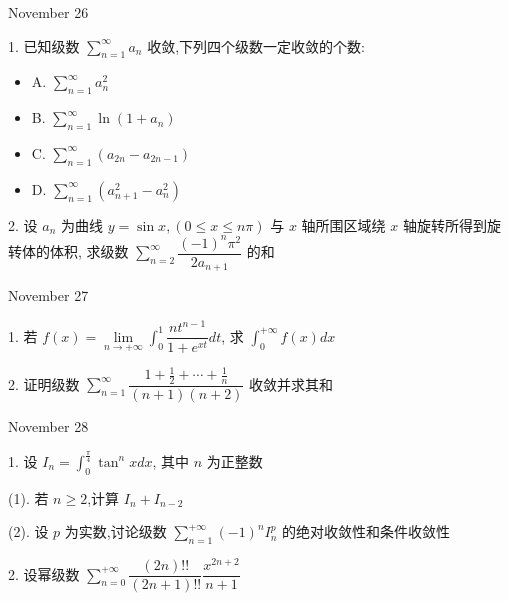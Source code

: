 \textcolor{purplea}{November 26}

1. 已知级数 $\sum\limits_{n=1}^{\infty}a_{n}$ 收敛,下列四个级数一定收敛的个数:
\begin{itemize}
	\item A. $\sum\limits_{n=1}^{\infty}a_{n}^{2}$
	\item B. $\sum\limits_{n=1}^{\infty}\ln(1+a_{n})$
	\item C. $\sum\limits_{n=1}^{\infty}(a_{2n}-a_{2n-1})$
	\item D. $\sum\limits_{n=1}^{\infty}(a_{n+1}^{2}-a_{n}^{2})$
\end{itemize}
\begin{solution}
	
\end{solution}


2. 设 $a_{n}$ 为曲线 $y=\sin x,(0\leq x\leq n\pi)$ 与 $x$ 轴所围区域绕 $x$ 轴旋转所得到旋转体的体积,
求级数 $\sum\limits_{n=2}^{\infty}\dfrac{(-1)^{n}\pi^{2}}{2a_{n+1}}$ 的和
\begin{solution}
	
\end{solution}

\textcolor{purplea}{November 27}

1. 若 $\displaystyle{f(x)=\lim\limits_{n\to+\infty}\int_{0}^{1}\dfrac{nt^{n-1}}{1+e^{xt}}dt}$,
求 $\int_{0}^{+\infty}f(x)dx$
\begin{solution}
	
\end{solution}

2. 证明级数 $\sum\limits_{n=1}^{\infty}\dfrac{1+\frac{1}{2}+\cdots+\frac{1}{n}}{(n+1)(n+2)}$ 收敛并求其和
\begin{solution}
	
\end{solution}

\textcolor{purplea}{November 28}

1. 设 $I_{n}=\int_{0}^{\frac{\pi}{4}}\tan^{n}xdx$, 其中 $n$ 为正整数

(1). 若 $n\geq 2$,计算 $I_{n}+I_{n-2}$

(2). 设 $p$ 为实数,讨论级数 $\sum\limits_{n=1}^{+\infty}(-1)^{n}I_{n}^{p}$ 的绝对收敛性和条件收敛性
\begin{solution}
	
\end{solution}

2. 设幂级数 $\sum\limits_{n=0}^{+\infty}\dfrac{(2n)!!}{(2n+1)!!}\dfrac{x^{2n+2}}{n+1}$

